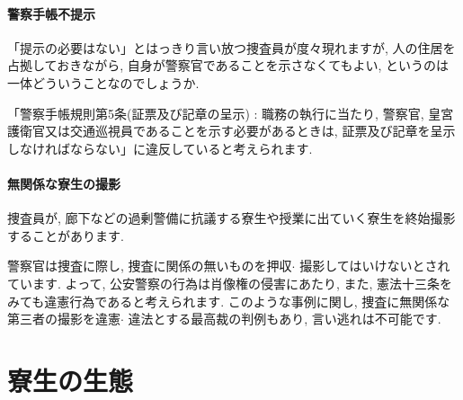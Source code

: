 \documentclass[10pt,b5jsbook,dvips,dvipdfmx,openany]{jsbook}
\theoremstyle{definition}
\begin{document}
			\subsubsection{警察手帳不提示}
			「提示の必要はない」とはっきり言い放つ捜査員が度々現れますが, 人の住居を占拠しておきながら, 自身が警察官であることを示さなくてもよい, というのは一体どういうことなのでしょうか.

			「警察手帳規則第5条(証票及び記章の呈示) : 職務の執行に当たり, 警察官, 皇宮護衛官又は交通巡視員であることを示す必要があるときは, 証票及び記章を呈示しなければならない」に違反していると考えられます.

			\subsubsection{無関係な寮生の撮影}
			捜査員が, 廊下などの過剰警備に抗議する寮生や授業に出ていく寮生を終始撮影することがあります.

			警察官は捜査に際し, 捜査に関係の無いものを押収$ \cdot $ 撮影してはいけないとされています. よって, 公安警察の行為は肖像権の侵害にあたり, また, 憲法十三条をみても違憲行為であると考えられます. このような事例に関し, 捜査に無関係な第三者の撮影を違憲$ \cdot $ 違法とする最高裁の判例もあり, 言い逃れは不可能です.


\chapter{寮生の生態} %
\end{document}
